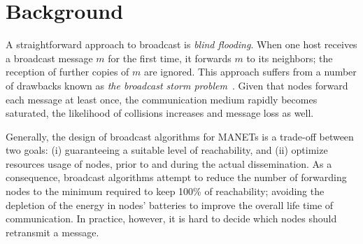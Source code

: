 
\section{Background}
\label{sec:background}

%
%


A straightforward approach to broadcast is \textit{blind flooding}.
%
When one host receives a broadcast message $m$ for the first time, it forwards $m$ to its neighbors; the reception of further copies of $m$ are ignored.
%
This approach suffers from a number of drawbacks known as \textit{the broadcast storm problem}~\cite{Ni:1999:BSP:313451.313525}.
%
Given that nodes forward each message at least once, the communication medium rapidly becomes saturated, the likelihood of collisions increases and message loss as well.

%
Generally, the design of broadcast algorithms for MANETs is a trade-off between two goals: (i) guaranteeing a suitable level of reachability, and (ii) optimize resources usage of nodes, prior to and during the actual dissemination.
%
As a consequence, broadcast algorithms attempt to reduce the number of forwarding nodes to the minimum required to keep 100\% of reachability; avoiding the depletion of the energy in nodes' batteries to improve the overall life time of communication.
%
In practice, however, it is hard to decide which nodes should retransmit a message.


